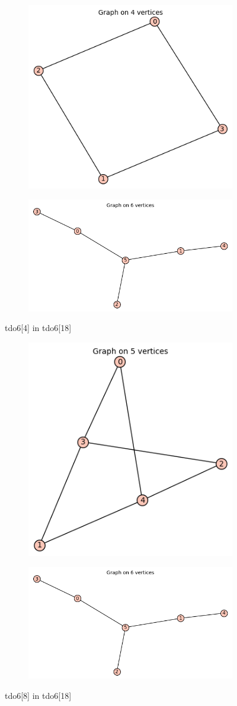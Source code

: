 \documentclass[12pt, a4paper]{article}
\begin{document}
\begin{center}
\begin{figure}[!htb]
\centering
\begin{subfigure}{0.5\textwidth}
  \centering
  \includegraphics[width=0.5\linewidth]{tdo6[4]}
\end{subfigure}%
\begin{subfigure}{0.5\textwidth}
  \centering
  \includegraphics[width=0.6\linewidth]{tdo6[18]}
\end{subfigure}
\caption{tdo6[4] in tdo6[18]}
\label{fig:test}
\end{figure}

\begin{figure}[!htb]
\centering
\begin{subfigure}{0.5\textwidth}
  \centering
  \includegraphics[width=0.5\linewidth]{tdo6[8]}
\end{subfigure}%
\begin{subfigure}{0.5\textwidth}
  \centering
  \includegraphics[width=0.6\linewidth]{tdo6[18]}
\end{subfigure}
\caption{tdo6[8] in tdo6[18]}
\label{fig:test}
\end{figure}


\end{center}
\end{document}

